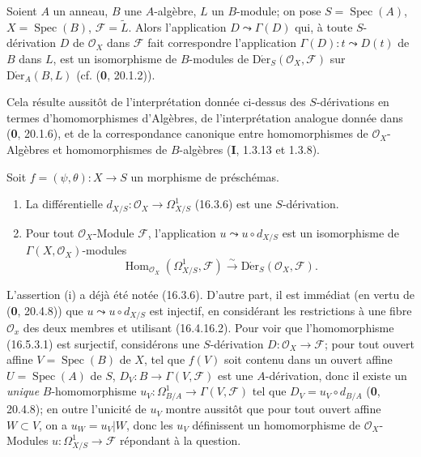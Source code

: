 \begin{proposition}[16.5.2]
\label{IV.16.5.2}
Soient $A$ un anneau, $B$ une $A$-algèbre, $L$ un $B$-module; on pose
$S=\operatorname{Spec}(A)$, $X=\operatorname{Spec}(B)$,
$\mathscr{F}=\widetilde{L}$. Alors l'application $D\leadsto\Gamma(D)$ qui, à
toute $S$-dérivation $D$ de $\mathcal{O}_X$ dans $\mathscr{F}$ fait
correspondre l'application $\Gamma(D):t\leadsto D(t)$ de $B$ dans $L$, est un
isomorphisme de $B$-modules de
$\operatorname{D\acute{e}r}_S(\mathcal{O}_X,\mathscr{F})$ sur
$\operatorname{D\acute{e}r}_A(B,L)$ \textup{(cf. (\textbf{0}, 20.1.2))}.
\end{proposition}

Cela résulte aussitôt de l'interprétation donnée ci-dessus des $S$-dérivations
en termes
d'homomorphismes d'Algèbres, de l'interprétation analogue donnée dans
(\textbf{0}, 20.1.6), et de la correspondance canonique entre homomorphismes de
$\mathcal{O}_X$-Algèbres et homomorphismes de $B$-algèbres (\textbf{I}, 1.3.13 et
1.3.8).

\begin{proposition}[16.5.3]
\label{IV.16.5.3}
Soit $f=(\psi,\theta):X\to S$ un morphisme de préschémas.
\begin{enumerate}
\item[\textup{(i)}] La différentielle
$d_{X/S}:\mathcal{O}_X\to\varOmega_{X/S}^1$ \textup{(16.3.6)} est une $S$-dérivation.
\item[\textup{(ii)}] Pour tout $\mathcal{O}_X$-Module $\mathscr{F}$, l'application
$u\leadsto u\circ d_{X/S}$ est un isomorphisme de
$\Gamma(X,\mathcal{O}_X)$-modules
\[
  \operatorname{Hom}_{\mathcal{O}_X}(\varOmega_{X/S}^1,\mathscr{F})
  \xrightarrow{\sim}
  \operatorname{D\acute{e}r}_S(\mathcal{O}_X,\mathscr{F}).
  \tag{16.5.3.1}
  \label{IV.16.5.3.1}
\]
\end{enumerate}
\end{proposition}

L'assertion (i) a déjà été notée (16.3.6). D'autre part, il est immédiat (en
vertu de (\textbf{0}, 20.4.8)) que $u\leadsto u\circ d_{X/S}$ est injectif, en
considérant les restrictions à une fibre $\mathcal{O}_x$ des deux membres et
utilisant (16.4.16.2). Pour voir que l'homomorphisme (16.5.3.1) est surjectif,
considérons une $S$-dérivation $D:\mathcal{O}_X\to\mathscr{F}$; pour tout
ouvert affine $V=\operatorname{Spec}(B)$ de $X$, tel que $f(V)$ soit contenu
dans un ouvert affine $U=\operatorname{Spec}(A)$ de $S$,
$D_V:B\to\Gamma(V,\mathscr{F})$ est une $A$-dérivation, donc il existe un
\emph{unique} $B$-homomorphisme
$u_V:\Omega_{B/A}^1\to\Gamma(V,\mathscr{F})$ tel que
$D_V=u_V\circ d_{B/A}$ (\textbf{0}, 20.4.8); en outre l'unicité de $u_V$ montre
aussitôt que pour tout ouvert affine $W\subset V$, on a $u_W=u_V|W$, donc les
$u_V$ définissent un homomorphisme de $\mathcal{O}_X$-Modules
$u:\varOmega_{X/S}^1\to\mathscr{F}$ répondant à la question.

